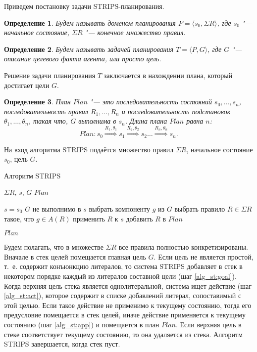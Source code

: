 \documentclass[b5paper,11pt]{book}
\newtheorem{Def}{Определение}
\numberwithin{Def}{section}
\numberwithin{Th}{chapter}
\numberwithin{St}{chapter}
\begin{document}
	Приведем постановку задачи STRIPS-планирования.
	
	\begin{Def}
		Будем называть доменом планирования $P = \langle s_0, \Sigma R\rangle$, где $s_0$ "--- начальное состояние, $\Sigma R$ "--- конечное множество правил.
	\end{Def}
	\begin{Def}
		Будем называть задачей планирования $T = \langle P, G\rangle$, где $G$ "--- описание целевого факта агента, или просто цель.
	\end{Def}

	Решение задачи планирования $T$ заключается в нахождении плана, который достигает цели $G$.
	\begin{Def}
		План $Plan$ "--- это последовательность состояний $s_0,\dots,s_n$, последовательность правил $R_1,\dots,R_n$ и последовательность подстановок $\theta_1,\dots,\theta_n$, такая что, $G$ выполнима в $s_n$. Длина плана $Plan$ равна $n$:
		\[
			Plan: s_0 \overset{R_1,\theta_1}{\Rightarrow} s_1 \overset{R_2,\theta_2}{\Rightarrow} s_2 \dots \overset{R_n,\theta_n}{\Rightarrow} s_n.
		\]
	\end{Def}
	
	На вход алгоритма STRIPS подаётся множество правил $\Sigma R$, начальное состояние $s_0$, цель $G$.
	
	\begin{algorithm}[H]
		\caption{Алгоритм STRIPS}\label{alg:strips}
		\begin{algorithmic}[1]
			\Require $\Sigma R$, $s$, $G$
			\Ensure $Plan$
			
			\State $s=s_0$
			\While $G$ не выполнимо в $s$
				\State выбрать компоненту $g$ из $G$ \label{alg_st:goal}
				\State выбрать правило $R\in\Sigma R$ такое, что $g\in A(R)$ \label{alg_st:act}
				\State {}
				\State применить $R$ к $s$ \label{alg_st:app}
				\State добавить $R$ в $Plan$
			\EndWhile
			
			\Return $Plan$
		\end{algorithmic}
	\end{algorithm}

	Будем полагать, что в множестве $\Sigma R$ все правила полностью конкретизированы. Вначале в стек целей помещается главная цель $G$. Если цель не является простой, т.~е. содержит конъюнкцию литералов, то система STRIPS добавляет в стек в некотором порядке каждый из литералов составной цели (шаг \autoref{alg_st:goal}). Когда верхняя цель стека является однолитеральной, система ищет действие (шаг \autoref{alg_st:act}), которое содержит в списке добавлений литерал, сопоставимый с этой целью. Если такое действие не применимо к текущему состоянию, тогда его предусловие помещается в стек целей, иначе действие применяется к текущему состоянию (шаг \autoref{alg_st:app}) и помещается в план $Plan$. Если верхняя цель в стеке соответствует текущему состоянию, то она удаляется из стека. Алгоритм STRIPS завершается, когда стек пуст.
	
\end{document}
